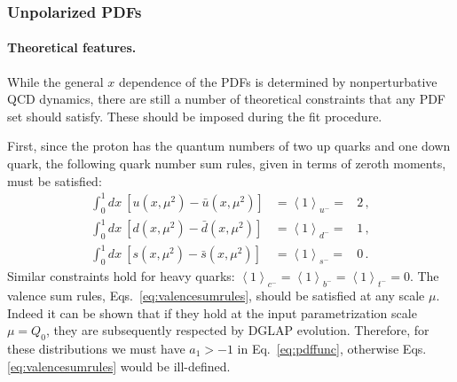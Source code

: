 \subsubsection{Unpolarized PDFs}
\label{sec:unpPDFs}

\paragraph*{Theoretical features.}
While the general $x$ dependence of the PDFs is determined by
nonperturbative QCD dynamics, there are still a number
of theoretical constraints that any PDF set should satisfy. 
%
These should be imposed during the fit procedure.

First, since the proton has the quantum numbers of two up quarks and one 
down quark, the following quark number sum rules, given in terms of zeroth
moments, must be satisfied: 
\begin{eqnarray}
\int_{0}^{1}dx\ \left[u(x,\mu^2)-\bar{u}(x,\mu^2)\right] 
& =\left\langle 1\right\rangle _{u^{-}}= & 2 \, ,\nonumber \\
\int_{0}^{1}dx\ \left[d(x,\mu^2)-\bar{d}(x,\mu^2)\right] 
& =\left\langle 1\right\rangle _{d^{-}}= & 1 \, ,
\label{eq:valencesumrules}\\
\int_{0}^{1}dx\ \left[s(x,\mu^2)-\bar{s}(x,\mu^2)\right] 
& =\left\langle 1\right\rangle _{s^{-}}= & 0 \, .\nonumber
\end{eqnarray}
%
Similar constraints hold for heavy quarks: 
$\left\langle 1\right\rangle _{c^{-}}=\left\langle 1\right\rangle _{b^{-}}
=\left\langle 1\right\rangle _{t^{-}}=0$.
%
The valence sum rules, Eqs.~\eqref{eq:valencesumrules}, should be satisfied at 
any scale $\mu$. 
%
Indeed it can be shown that if they hold at the input parametrization scale 
$\mu=Q_0$, they are subsequently respected by DGLAP evolution.
%
Therefore, for these distributions we must have $a_1>-1$ in
Eq.~\eqref{eq:pdffunc}, otherwise Eqs.\eqref{eq:valencesumrules} 
would be ill-defined.

